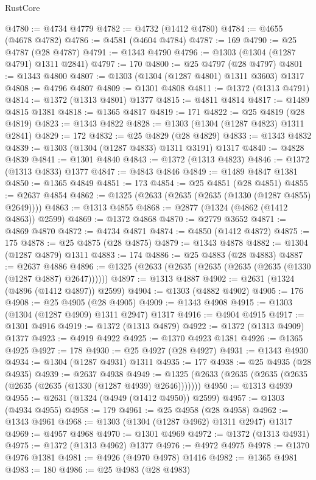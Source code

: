 \begin{lexlean}{RustCore}
\begin{coremodule}
@4780 := @4734 @4779
@4782 := @4732 (@1412 @4780)
@4784 := @4655 (@4678 @4782)
@4786 := @4581 (@4604 @4784)
@4787 := 169
@4790 := @25 @4787 (@28 @4787)
@4791 := @1343 @4790
@4796 := @1303 (@1304 (@1287 @4791) @1311 @2841)
@4797 := 170
@4800 := @25 @4797 (@28 @4797)
@4801 := @1343 @4800
@4807 := @1303 (@1304 (@1287 @4801) @1311 @3603) @1317
@4808 := @4796 @4807
@4809 := @1301 @4808
@4811 := @1372 (@1313 @4791)
@4814 := @1372 (@1313 @4801) @1377
@4815 := @4811 @4814
@4817 := @1489 @4815 @1381
@4818 := @1365 @4817
@4819 := 171
@4822 := @25 @4819 (@28 @4819)
@4823 := @1343 @4822
@4828 := @1303 (@1304 (@1287 @4823) @1311 @2841)
@4829 := 172
@4832 := @25 @4829 (@28 @4829)
@4833 := @1343 @4832
@4839 := @1303 (@1304 (@1287 @4833) @1311 @3191) @1317
@4840 := @4828 @4839
@4841 := @1301 @4840
@4843 := @1372 (@1313 @4823)
@4846 := @1372 (@1313 @4833) @1377
@4847 := @4843 @4846
@4849 := @1489 @4847 @1381
@4850 := @1365 @4849
@4851 := 173
@4854 := @25 @4851 (@28 @4851)
@4855 := @2637 @4854
@4862 := @1325 (@2633 (@2635 (@2635 (@1330 (@1287 @4855) @2649))))
@4863 := @1313 @4855
@4868 := @2877 (@1324 (@4862 (@1412 @4863)) @2599)
@4869 := @1372 @4868
@4870 := @2779 @3652
@4871 := @4869 @4870
@4872 := @4734 @4871
@4874 := @4850 (@1412 @4872)
@4875 := 175
@4878 := @25 @4875 (@28 @4875)
@4879 := @1343 @4878
@4882 := @1304 (@1287 @4879) @1311
@4883 := 174
@4886 := @25 @4883 (@28 @4883)
@4887 := @2637 @4886
@4896 := @1325 (@2633 (@2635 (@2635 (@2635 (@2635 (@1330 (@1287 @4887) @2647))))))
@4897 := @1313 @4887
@4902 := @2631 (@1324 (@4896 (@1412 @4897)) @2599)
@4904 := @1303 (@4882 @4902)
@4905 := 176
@4908 := @25 @4905 (@28 @4905)
@4909 := @1343 @4908
@4915 := @1303 (@1304 (@1287 @4909) @1311 @2947) @1317
@4916 := @4904 @4915
@4917 := @1301 @4916
@4919 := @1372 (@1313 @4879)
@4922 := @1372 (@1313 @4909) @1377
@4923 := @4919 @4922
@4925 := @1370 @4923 @1381
@4926 := @1365 @4925
@4927 := 178
@4930 := @25 @4927 (@28 @4927)
@4931 := @1343 @4930
@4934 := @1304 (@1287 @4931) @1311
@4935 := 177
@4938 := @25 @4935 (@28 @4935)
@4939 := @2637 @4938
@4949 := @1325 (@2633 (@2635 (@2635 (@2635 (@2635 (@2635 (@1330 (@1287 @4939) @2646)))))))
@4950 := @1313 @4939
@4955 := @2631 (@1324 (@4949 (@1412 @4950)) @2599)
@4957 := @1303 (@4934 @4955)
@4958 := 179
@4961 := @25 @4958 (@28 @4958)
@4962 := @1343 @4961
@4968 := @1303 (@1304 (@1287 @4962) @1311 @2947) @1317
@4969 := @4957 @4968
@4970 := @1301 @4969
@4972 := @1372 (@1313 @4931)
@4975 := @1372 (@1313 @4962) @1377
@4976 := @4972 @4975
@4978 := @1370 @4976 @1381
@4981 := @4926 (@4970 @4978) @1416
@4982 := @1365 @4981
@4983 := 180
@4986 := @25 @4983 (@28 @4983)

\end{coremodule}
\end{lexlean}
